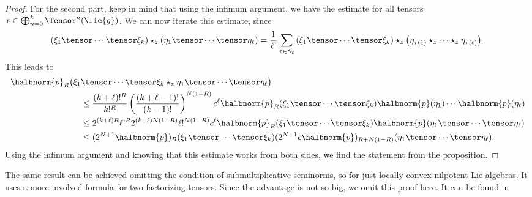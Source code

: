 \documentclass[
11pt,                          %
english                        %
]{article}
\begin{document}
\begin{proof}
	For the second part, keep in mind that using the infimum argument, we have the 
	estimate for all tensors $x \in \bigoplus_{n=0}^k \Tensor^n(\lie{g})$. We can 
	now iterate this estimate, since
	\begin{equation*}
		\left( \xi_1 \tensor \cdots \tensor \xi_k \right)
		\star_z
		\left( \eta_1 \tensor \cdots \tensor \eta_\ell \right)
		=
		\frac{1}{\ell!}
		\sum\limits_{\tau \in S_\ell}
		\left( \xi_1 \tensor \cdots \tensor \xi_k \right)
		\star_z
		\left( \eta_{\tau(1)} \star_z \cdots \star_z \eta_{\tau(\ell)} \right).
	\end{equation*}
	This leads to
	\begin{align*}
		\halbnorm{p}_R
		\big(
			\xi_1
		&	
			 \tensor \cdots \tensor \xi_k 
			 \star_z 
			 \eta_1 \tensor \cdots \tensor \eta_\ell
		\big)
		\\
		& \leq
		\frac{(k + \ell)!^R}{k!^R}
		\left(
			\frac{(k + \ell - 1)!}{(k - 1)!}
		\right)^{N (1 - R)}
		c^\ell
		\halbnorm{p}_R( \xi_1 \tensor \cdots \tensor \xi_k )
		\halbnorm{p}( \eta_1 ) \cdots \halbnorm{p} ( \eta_\ell )
		\\
		& \leq
		2^{(k + \ell) R}
		\ell!^R
		2^{(k + \ell) N (1 - R)}
		\ell!^{N (1 - R)}
		c^\ell
		\halbnorm{p}_R( \xi_1 \tensor \cdots \tensor \xi_k )
		\halbnorm{p}( \eta_1 \tensor \cdots \tensor \eta_\ell )
		\\
		& \leq
		(2^{N + 1} \halbnorm{p})_R
		( \xi_1 \tensor \cdots \tensor \xi_k )
		(2^{N + 1} c \halbnorm{p})_{R + N (1 - R)}
		( \eta_1 \tensor \cdots \tensor \eta_\ell ).
	\end{align*}
	Using the infimum argument and knowing that this estimate works from both sides,
	we find the statement from the proposition.
\end{proof}
\begin{remark}
	The same result can be achieved omitting the condition of submultiplicative 
	seminorms, so for just locally convex nilpotent Lie algebras. It uses a more 
	involved formula for two factorizing tensors. Since the advantage is not so big,
	we omit this proof here. It can be found in \cite{stapor:2015a}
\end{remark}
\end{document}
